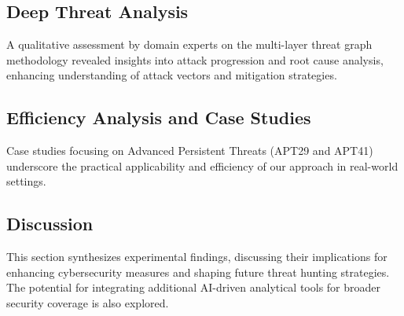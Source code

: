 \subsection{Deep Threat Analysis}\label{sec:deep-threat}
A qualitative assessment by domain experts on the multi-layer threat graph methodology revealed insights into attack progression and root cause analysis, enhancing understanding of attack vectors and mitigation strategies.

\subsection{Efficiency Analysis and Case Studies}\label{sec:effi}
Case studies focusing on Advanced Persistent Threats (APT29 and APT41) underscore the practical applicability and efficiency of our approach in real-world settings.

\subsection{Discussion}\label{sec:dis}
This section synthesizes experimental findings, discussing their implications for enhancing cybersecurity measures and shaping future threat hunting strategies. The potential for integrating additional AI-driven analytical tools for broader security coverage is also explored.
